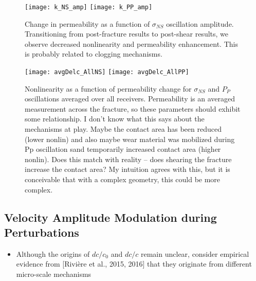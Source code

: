 \documentclass[letterpaper,10pt]{article}
\begin{document}
\newpage

\begin{figure}[ht]
	\centering
	\texttt{[image: k\_NS\_amp]}
	\texttt{[image: k\_PP\_amp]}
	\caption{Change in permeability as a function of $ \sigma_{NS} $ oscillation amplitude. Transitioning from post-fracture results to post-shear results, we observe decreased nonlinearity and permeability enhancement. This is probably related to clogging mechanisms.}%
	\label{fig:perm_ns_amp}
\end{figure}

\newpage


\begin{figure}[ht]
	\centering
	\texttt{[image: avgDelc\_AllNS]}
	\texttt{[image: avgDelc\_AllPP]}
	\caption{Nonlinearity as a function of permeability change for $ \sigma_{NS} $ and $ P_P $ oscillations averaged over all receivers. Permeability is an averaged measurement across the fracture, so these parameters should exhibit some relationship. I don’t know what this says about the mechanisms at play. Maybe the contact area has been reduced (lower nonlin) and also maybe wear material was mobilized during Pp oscillation sand temporarily increased contact area (higher nonlin). Does this match with reality -- does shearing the fracture increase the contact area? My intuition agrees with this, but it is conceivable that with a complex geometry, this could be more complex.}
	\label{fig:delc_plots2}
\end{figure}

\newpage


\subsection{Velocity Amplitude Modulation during Perturbations}




\begin{itemize}
	\item Although the origins of $dc/c_0 $ and $ dc/c $ remain unclear, consider empirical evidence from [Rivière et al., 2015, 2016] that they originate from different micro-scale mechanisms 
\end{itemize}
\end{document}
